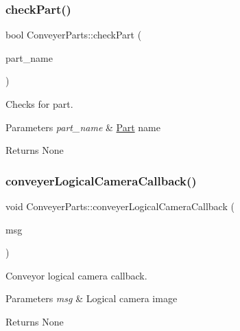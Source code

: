 \subsubsection{\texorpdfstring{check\+Part()}{checkPart()}}
{\footnotesize\ttfamily bool Conveyer\+Parts\+::check\+Part (\begin{DoxyParamCaption}\item[{const std\+::string \&}]{part\+\_\+name }\end{DoxyParamCaption})}



Checks for part. 


\begin{DoxyParams}{Parameters}
{\em part\+\_\+name} & \hyperlink{structPart}{Part} name \\
\hline
\end{DoxyParams}
\begin{DoxyReturn}{Returns}
None 
\end{DoxyReturn}
\mbox{\label{classConveyerParts_a4e63b43cf4de0e31ed58a89b1fc2654c}} 
\subsubsection{\texorpdfstring{conveyer\+Logical\+Camera\+Callback()}{conveyerLogicalCameraCallback()}}
{\footnotesize\ttfamily void Conveyer\+Parts\+::conveyer\+Logical\+Camera\+Callback (\begin{DoxyParamCaption}\item[{const nist\+\_\+gear\+::\+Logical\+Camera\+Image \&}]{msg }\end{DoxyParamCaption})}



Conveyor logical camera callback. 


\begin{DoxyParams}{Parameters}
{\em msg} & Logical camera image \\
\hline
\end{DoxyParams}
\begin{DoxyReturn}{Returns}
None 
\end{DoxyReturn}
\mbox{\label{classConveyerParts_a57188292039617070e9042ad3133a5f8}} 
